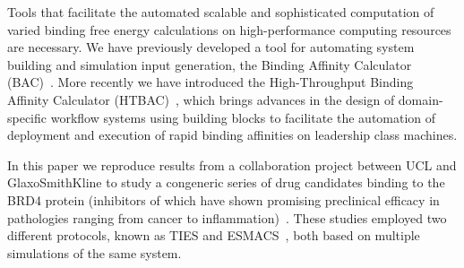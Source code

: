 
Tools that facilitate the automated scalable and sophisticated computation of
varied binding free energy calculations on high-performance computing
resources are necessary. We have previously developed a tool for automating
system building and simulation input generation, the Binding Affinity
Calculator (BAC)~\cite{Sadiq2008}. More recently we have introduced the 
High-Throughput Binding Affinity Calculator (HTBAC)~\cite{dakka2017}, 
which brings advances in the design of domain-specific workflow systems 
using building blocks to facilitate the automation of deployment 
and execution of rapid binding affinities on leadership class machines. 







In this paper we reproduce results from a collaboration project between UCL
and GlaxoSmithKline to study a congeneric series of drug candidates binding to
the BRD4 protein (inhibitors of which have shown promising preclinical
efficacy in pathologies ranging from cancer to
inflammation)~\cite{Wan2017brd4}. These studies employed two different
protocols, known as TIES and ESMACS~\cite{Bhati2017}, both based on multiple
simulations of the same system. 


